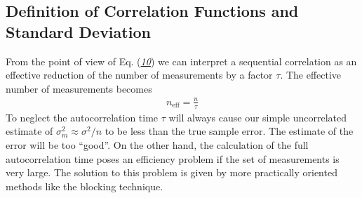 \documentclass[letterpaper,10pt,english]{sphinxmanual}
\begin{document}
\subsection{Definition of Correlation Functions and Standard Deviation}
\label{\detokenize{chapter3:id8}}
From the point of view of
Eq. ({\hyperref[\detokenize{chapter3:eq:error_estimate_corr_time}]{\emph{10}}}) we can interpret a sequential
correlation as an effective reduction of the number of measurements by
a factor \(\tau\). The effective number of measurements becomes
\begin{equation*}
\begin{split}
n_\mathrm{eff} = \frac{n}{\tau}
\end{split}
\end{equation*}
To neglect the autocorrelation time \(\tau\) will always cause our
simple uncorrelated estimate of \(\sigma_m^2\approx \sigma^2/n\) to
be less than the true sample error. The estimate of the error will be
too “good”. On the other hand, the calculation of the full
autocorrelation time poses an efficiency problem if the set of
measurements is very large.  The solution to this problem is given by
more practically oriented methods like the blocking technique.
\end{document}
